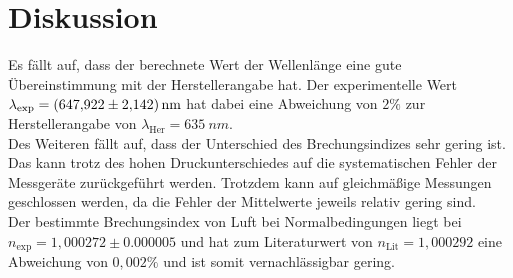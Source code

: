 \section{Diskussion}
Es fällt auf, dass der berechnete Wert der Wellenlänge eine gute Übereinstimmung mit der Herstellerangabe hat.
Der experimentelle Wert $\lambda_\text{exp} = \SI{647,922 \pm 2,142}{nm}$ hat dabei eine Abweichung von $2 \%$ zur Herstellerangabe von $\lambda_\text{Her} = \SI{635}{nm}$.\\
Des Weiteren fällt auf, dass der Unterschied des Brechungsindizes sehr gering ist.
Das kann trotz des hohen Druckunterschiedes auf die systematischen Fehler der Messgeräte zurückgeführt werden.
Trotzdem kann auf gleichmäßige Messungen geschlossen werden, da die Fehler der Mittelwerte jeweils relativ gering sind.\\
Der bestimmte Brechungsindex von Luft bei Normalbedingungen liegt bei $n_\text{exp} = 1,000272 \pm 0.000005$ und hat zum Literaturwert von $n_\text{Lit} = 1,000292$ eine Abweichung von $0,002 \%$ und ist somit vernachlässigbar gering.
